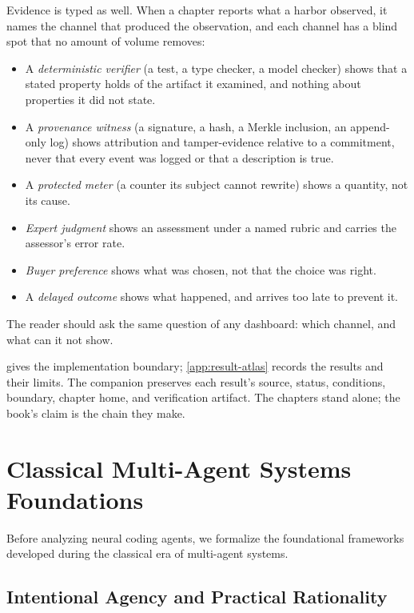 Evidence is typed as well. When a chapter reports what a harbor observed, it
names the channel that produced the observation, and each channel has a blind
spot that no amount of volume removes:
\begin{itemize}[leftmargin=1.8em,itemsep=2pt]
  \item A \emph{deterministic verifier} (a test, a type checker, a model checker) shows that a stated property holds of the artifact it examined, and nothing about properties it did not state.
  \item A \emph{provenance witness} (a signature, a hash, a Merkle inclusion, an append-only log) shows attribution and tamper-evidence relative to a commitment, never that every event was logged or that a description is true.
  \item A \emph{protected meter} (a counter its subject cannot rewrite) shows a quantity, not its cause.
  \item \emph{Expert judgment} shows an assessment under a named rubric and carries the assessor's error rate.
  \item \emph{Buyer preference} shows what was chosen, not that the choice was right.
  \item A \emph{delayed outcome} shows what happened, and arrives too late to prevent it.
\end{itemize}
The reader should ask the same question of any dashboard: which channel, and what can it not show.

 gives the implementation boundary;
\cref{app:result-atlas} records the results and their limits. The companion
 preserves each
result's source, status, conditions, boundary, chapter home, and verification
artifact. The chapters stand alone; the book's claim is the chain they make.

\section{Classical Multi-Agent Systems Foundations}\label{sec:prereq-classical-mas}

Before analyzing neural coding agents, we formalize the foundational frameworks developed during the classical era of multi-agent systems.

\subsection{Intentional Agency and Practical Rationality}

